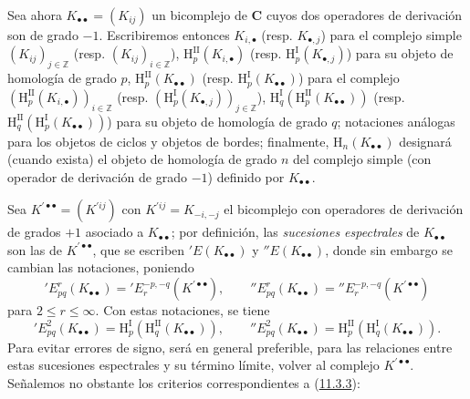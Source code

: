 \begin{env}[11.3.5]
\label{0.11.3.5-fr}
Sea ahora $K_{\bullet\bullet}=(K_{ij})$ un bicomplejo de
$\boldsymbol{C}$ cuyos dos operadores de derivación son de grado $-1$. Escribiremos
entonces $K_{i,\bullet}$ (resp. $K_{\bullet,j}$) para el complejo simple
$(K_{ij})_{j\in\mathbb Z}$ (resp. $(K_{ij})_{i\in\mathbb Z}$),
$\mathrm H_p^{\mathrm{II}}(K_{i,\bullet})$ (resp.
$\mathrm H_p^{\mathrm I}(K_{\bullet,j})$) para su objeto de homología de grado $p$,
$\mathrm H_p^{\mathrm{II}}(K_{\bullet\bullet})$ (resp.
$\mathrm H_p^{\mathrm I}(K_{\bullet\bullet})$) para el complejo
$(\mathrm H_p^{\mathrm{II}}(K_{i,\bullet}))_{i\in\mathbb Z}$ (resp.
$(\mathrm H_p^{\mathrm I}(K_{\bullet,j}))_{j\in\mathbb Z}$),
$\mathrm H_q^{\mathrm I}(\mathrm H_p^{\mathrm{II}}(K_{\bullet\bullet}))$
(resp.
$\mathrm H_q^{\mathrm{II}}(\mathrm H_p^{\mathrm I}(K_{\bullet\bullet}))$)
para su objeto de homología de grado $q$; notaciones análogas para los objetos de ciclos
y objetos de bordes; finalmente, $\mathrm H_n(K_{\bullet\bullet})$ designará
(cuando exista) el objeto de homología de grado $n$ del complejo simple (con
operador de derivación de grado $-1$) definido por $K_{\bullet\bullet}$.

Sea $K^{\prime\bullet\bullet}=(K^{\prime ij})$ con
$K^{\prime ij}=K_{-i,-j}$ el bicomplejo con operadores de derivación de grados
$+1$ asociado a $K_{\bullet\bullet}$; por definición, las
\emph{sucesiones espectrales} de $K_{\bullet\bullet}$ son las de
$K^{\prime\bullet\bullet}$, que se escriben $'E(K_{\bullet\bullet})$ y
$''E(K_{\bullet\bullet})$, donde sin embargo se cambian las notaciones, poniendo
\[
  'E_{pq}^r(K_{\bullet\bullet})
  ='E_r^{-p,-q}(K^{\prime\bullet\bullet}),\qquad
  ''E_{pq}^r(K_{\bullet\bullet})
  =''E_r^{-p,-q}(K^{\prime\bullet\bullet})
\]
para $2\leq r\leq\infty$. Con estas notaciones, se tiene
\[
  'E_{pq}^2(K_{\bullet\bullet})
  =\mathrm H_p^{\mathrm I}(\mathrm H_q^{\mathrm{II}}(K_{\bullet\bullet})),
  \qquad
  ''E_{pq}^2(K_{\bullet\bullet})
  =\mathrm H_p^{\mathrm{II}}(\mathrm H_q^{\mathrm I}(K_{\bullet\bullet})).
\]
Para evitar errores de signo, será en general preferible, para las
relaciones entre estas sucesiones espectrales y su término límite, volver al
complejo $K^{\prime\bullet\bullet}$. Señalemos no obstante los criterios
correspondientes a (\hyperref[0.11.3.3-fr]{11.3.3}):
\end{env}

